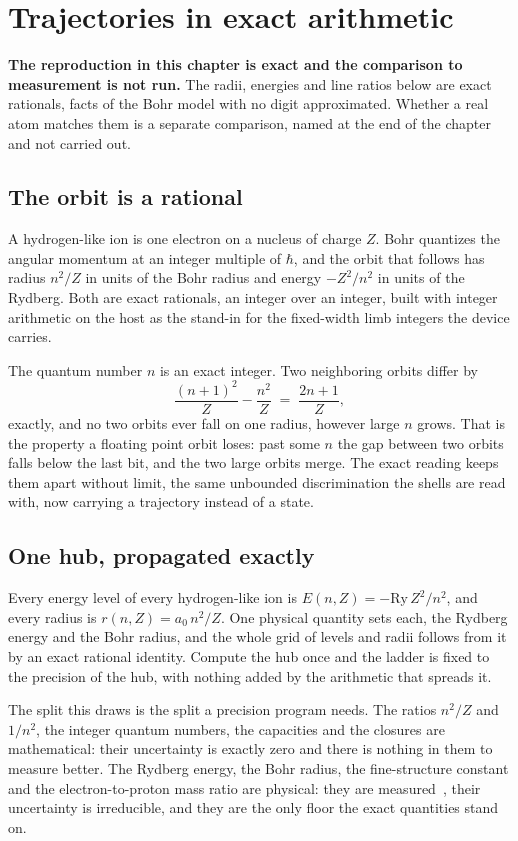 \chapter{Trajectories in exact arithmetic}

\textbf{The reproduction in this chapter is exact and the comparison to measurement is not run.} The
radii, energies and line ratios below are exact rationals, facts of the Bohr model with no digit
approximated. Whether a real atom matches them is a separate comparison, named at the end of the
chapter and not carried out.

\section{The orbit is a rational}

A hydrogen-like ion is one electron on a nucleus of charge $Z$. Bohr quantizes the angular momentum
at an integer multiple of $\hbar$, and the orbit that follows has radius $n^2/Z$ in units of the Bohr
radius and energy $-Z^2/n^2$ in units of the Rydberg. Both are exact rationals, an integer over an
integer, built with integer arithmetic on the host as the stand-in for the fixed-width limb integers
the device carries.

The quantum number $n$ is an exact integer. Two neighboring orbits differ by
\[
\frac{(n+1)^2}{Z} - \frac{n^2}{Z} \;=\; \frac{2n+1}{Z},
\]
exactly, and no two orbits ever fall on one radius, however large $n$ grows. That is the property a
floating point orbit loses: past some $n$ the gap between two orbits falls below the last bit, and the
two large orbits merge. The exact reading keeps them apart without limit, the same unbounded
discrimination the shells are read with, now carrying a trajectory instead of a state.

\section{One hub, propagated exactly}

Every energy level of every hydrogen-like ion is $E(n, Z) = -\mathrm{Ry}\, Z^2/n^2$, and every radius
is $r(n, Z) = a_0\, n^2/Z$. One physical quantity sets each, the Rydberg energy and the Bohr radius,
and the whole grid of levels and radii follows from it by an exact rational identity. Compute the hub
once and the ladder is fixed to the precision of the hub, with nothing added by the arithmetic that
spreads it.

The split this draws is the split a precision program needs. The ratios $n^2/Z$ and $1/n^2$, the
integer quantum numbers, the capacities and the closures are mathematical: their uncertainty is
exactly zero and there is nothing in them to measure better. The Rydberg energy, the Bohr radius, the
fine-structure constant and the electron-to-proton mass ratio are physical: they are
measured~\cite{src:Mohr-et-al-2025}, their uncertainty is irreducible, and they are the only floor the
exact quantities stand on.

